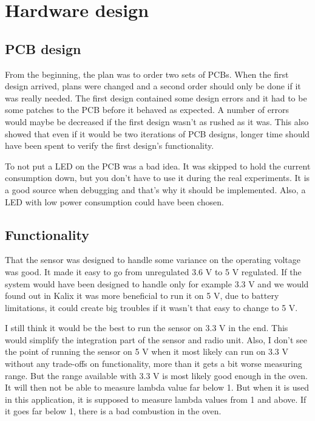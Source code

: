 
\section{Hardware design}

\subsection{PCB design}

From the beginning, the plan was to order two sets of PCBs. When the first design arrived, plans were changed and a second order should only be done if it was really needed. The first design contained some design errors and it had to be some patches to the PCB before it behaved as expected. A number of errors would maybe be decreased if the first design wasn't as rushed as it was. This also showed that even if it would be two iterations of PCB designs, longer time should have been spent to verify the first design's functionality.

To not put a LED on the PCB was a bad idea. It was skipped to hold the current consumption down, but you don't have to use it during the real experiments. It is a good source when debugging and that's why it should be implemented. Also, a LED with low power consumption could have been chosen.


\subsection{Functionality}

That the sensor was designed to handle some variance on the operating voltage was good. It made it easy to go from unregulated 3.6 V to 5 V regulated. If the system would have been designed to handle only for example 3.3 V and we would found out in Kalix it was more beneficial to run it on 5 V, due to battery limitations, it could create big troubles if it wasn't that easy to change to 5 V.


I still think it would be the best to run the sensor on 3.3 V in the end.  This would simplify the integration part of the sensor and radio unit. Also, I don't see the point of running the sensor on 5 V when it most likely can run on 3.3 V without any trade-offs on functionality, more than it gets a bit worse measuring range. But the range available with 3.3 V is most likely good enough in the oven. It will then not be able to measure lambda value far below 1. But when it is used in this application, it is supposed to measure lambda values from 1 and above. If it goes far below 1, there is a bad combustion in the oven.

